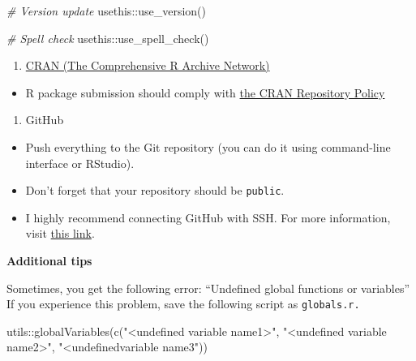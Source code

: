 \documentclass[
]{book}
\newenvironment{Shaded}{\begin{snugshade}}{\end{snugshade}}
\newcommand{\CommentTok}[1]{\textcolor[rgb]{0.56,0.35,0.01}{\textit{#1}}}
\newcommand{\FunctionTok}[1]{\textcolor[rgb]{0.00,0.00,0.00}{#1}}
\newcommand{\NormalTok}[1]{#1}
\newcommand{\SpecialCharTok}[1]{\textcolor[rgb]{0.00,0.00,0.00}{#1}}
\newcommand{\StringTok}[1]{\textcolor[rgb]{0.31,0.60,0.02}{#1}}
\providecommand{\tightlist}{%
  \setlength{\itemsep}{0pt}\setlength{\parskip}{0pt}}
\begin{document}
\begin{Shaded}
\begin{Highlighting}[]
\CommentTok{\# Version update }
\NormalTok{usethis}\SpecialCharTok{::}\FunctionTok{use\_version}\NormalTok{()}

\CommentTok{\# Spell check}
\NormalTok{usethis}\SpecialCharTok{::}\FunctionTok{use\_spell\_check}\NormalTok{()}
\end{Highlighting}
\end{Shaded}

\begin{enumerate}
\def\labelenumi{\arabic{enumi}.}
\tightlist
\item
  \href{https://cran.r-project.org/}{CRAN (The Comprehensive R Archive Network)}
\end{enumerate}

\begin{itemize}
\tightlist
\item
  R package submission should comply with \href{https://cran.r-project.org/}{the CRAN Repository Policy}
\end{itemize}

\begin{enumerate}
\def\labelenumi{\arabic{enumi}.}
\setcounter{enumi}{1}
\tightlist
\item
  GitHub
\end{enumerate}

\begin{itemize}
\item
  Push everything to the Git repository (you can do it using command-line interface or RStudio).
\item
  Don't forget that your repository should be \texttt{public}.
\item
  I highly recommend connecting GitHub with SSH. For more information, visit \href{https://docs.github.com/en/github/authenticating-to-github/connecting-to-github-with-ssh}{this link}.
\end{itemize}

\textbf{Additional tips}

Sometimes, you get the following error: ``Undefined global functions or variables'' If you experience this problem, save the following script as \texttt{globals.r.}

\begin{Shaded}
\begin{Highlighting}[]
\NormalTok{utils}\SpecialCharTok{::}\FunctionTok{globalVariables}\NormalTok{(}\FunctionTok{c}\NormalTok{(}\StringTok{"\textless{}undefined variable name1\textgreater{}"}\NormalTok{, }\StringTok{"\textless{}undefined variable name2\textgreater{}"}\NormalTok{, }\StringTok{"\textless{}undefinedvariable name3"}\NormalTok{))}
\end{Highlighting}
\end{Shaded}
\end{document}
